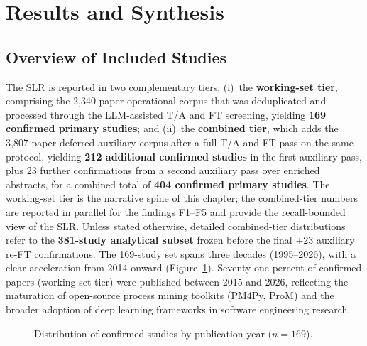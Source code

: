 \section{Results and Synthesis}
\label{sec:slr-synthesis}

\subsection{Overview of Included Studies}

The SLR is reported in two complementary tiers: (i)~the
\textbf{working-set tier}, comprising the 2{,}340-paper operational corpus
that was deduplicated and processed through the LLM-assisted T/A and FT
screening, yielding \textbf{169 confirmed primary studies}; and (ii)~the
\textbf{combined tier}, which adds the 3{,}807-paper deferred auxiliary
corpus after a full T/A and FT pass on the same protocol, yielding
\textbf{212 additional confirmed studies} in the first auxiliary pass, plus
23 further confirmations from a second auxiliary pass over enriched
abstracts, for a combined total of \textbf{404 confirmed primary studies}.
The working-set tier is the narrative spine of this chapter; the
combined-tier numbers are reported in parallel for the findings F1--F5 and
provide the recall-bounded view of the SLR. Unless stated otherwise,
detailed combined-tier distributions refer to the \textbf{381-study
analytical subset} frozen before the final +23 auxiliary re-FT
confirmations. The 169-study set spans three decades (1995--2026), with a clear
acceleration from 2014 onward (Figure~\ref{fig:year-dist}). Seventy-one
percent of confirmed papers (working-set tier) were published between 2015
and 2026, reflecting the maturation of open-source process mining toolkits
(PM4Py, ProM) and the broader adoption of deep learning frameworks in
software engineering research.

\begin{figure}[htbp]
\centering
{}
\caption{Distribution of confirmed studies by publication year ($n = 169$).}
\label{fig:year-dist}
\end{figure}

